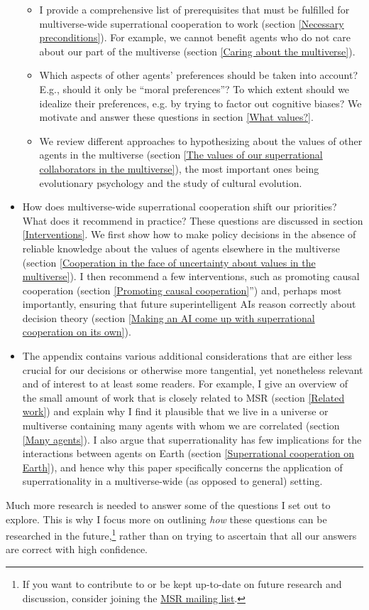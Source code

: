 \documentclass{book}
\begin{document}
\begin{itemize}
\begin{itemize}
		\item I provide a comprehensive list of prerequisites that must be fulfilled for multiverse-wide superrational cooperation to work (section \ref{Necessary preconditions}). For example, we cannot benefit agents who do not care about our part of the multiverse (section \ref{Caring about the multiverse}).
        \item Which aspects of other agents’ preferences should be taken into account? E.g., should it only be “moral preferences”? To which extent should we idealize their preferences, e.g. by trying to factor out cognitive biases? We motivate and answer these questions in section \ref{What values?}.
        \item We review different approaches to hypothesizing about the values of other agents in the multiverse (section \ref{The values of our superrational collaborators in the multiverse}), the most important ones being evolutionary psychology and the study of cultural evolution.
    \end{itemize}
    \item How does multiverse-wide superrational cooperation shift our priorities? What does it recommend in practice? These questions are discussed in section \ref{Interventions}. We first show how to make policy decisions in the absence of reliable knowledge about the values of agents elsewhere in the multiverse (section \ref{Cooperation in the face of uncertainty about values in the multiverse}). I then recommend a few interventions, such as promoting causal cooperation (section \ref{Promoting causal cooperation}”) and, perhaps most importantly, ensuring that future superintelligent AIs reason correctly about decision theory (section \ref{Making an AI come up with superrational cooperation on its own}).
    \item The appendix contains various additional considerations that are either less crucial for our decisions or otherwise more tangential, yet nonetheless relevant and of interest to at least some readers. For example, I give an overview of the small amount of work that is closely related to MSR (section \ref{Related work}) and explain why I find it plausible that we live in a universe or multiverse containing many agents with whom we are correlated (section \ref{Many agents}). I also argue that superrationality has few implications for the interactions between agents on Earth (section \ref{Superrational cooperation on Earth}), and hence why this paper specifically concerns the application of superrationality in a multiverse-wide (as opposed to general) setting.
\end{itemize}
Much more research is needed to answer some of the questions I set out to explore. This is why I focus more on outlining \textit{how} these questions can be researched in the future,\footnote{If you want to contribute to or be kept up-to-date on future research and discussion, consider joining the \href{https://groups.google.com/forum/\#!forum/multiverse-superrationality}{MSR mailing list}.} rather than on trying to ascertain that all our answers are correct with high confidence.
\end{document}
